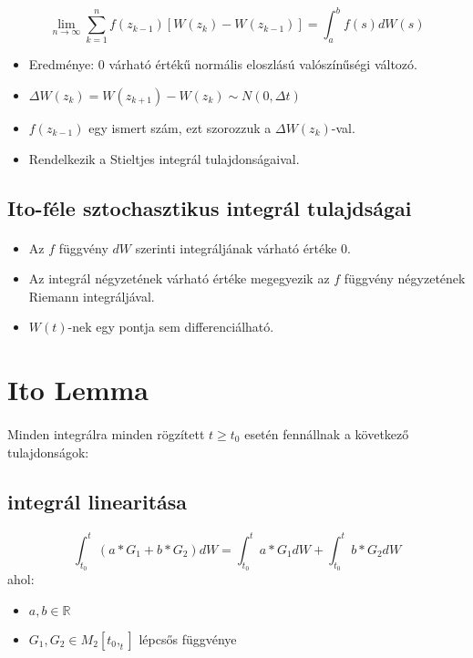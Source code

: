 \documentclass[11pt,a4paper]{article}
\begin{document}
				\paragraph{}
					$$\lim_{n \to \infty}\sum_{k=1}^{n} f(z_{k-1})[W(z_k)- W(z_{k-1})] = \int_{a}^b f(s) dW(s)$$
					\begin{itemize}
						\item Eredménye: $0$ várható értékű normális eloszlású valószínűségi változó.
						\item $\Delta W(z_k) = W(z_{k+1}) - W(z_k) \sim N(0, \Delta t)$
						\item $f(z_{k-1})$ egy ismert szám, ezt szorozzuk a $\Delta W(z_k)$-val.
						\item Rendelkezik a Stieltjes integrál tulajdonságaival.
					\end{itemize}
				\subsection{Ito-féle sztochasztikus integrál tulajdságai}
					\paragraph{}
						\begin{itemize}
							  \item Az $f$ függvény $dW$ szerinti integráljának várható értéke $0$.
							  \item Az integrál négyzetének várható értéke megegyezik az $f$ függvény négyzetének Riemann integráljával.
							  \item $W(t)$-nek egy pontja sem differenciálható.
						\end{itemize}
			\section{Ito Lemma}
				\paragraph{}
					Minden integrálra minden rögzített $t \ge t_0$ esetén fennállnak a következő tulajdonságok:
				\subsection{integrál linearitása}
					\paragraph{}
					$$\int_{t_0}^t (a*G_1 + b*G_2) dW =\int_{t_0}^t a*G_1 dW + \int_{t_0}^t b*G_2 dW$$
					ahol:
					\begin{itemize}
						\item $a,b \in \mathbb{R}$
						\item $G_1, G_2 \in M_2[t_0,_t]$ lépcsős függvénye
					\end{itemize}
\end{document}
